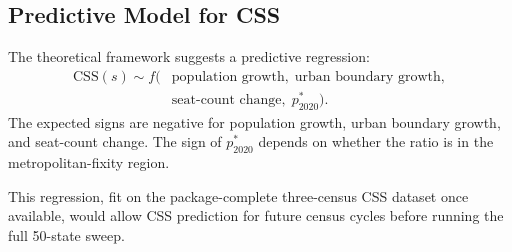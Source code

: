 \subsection{Predictive Model for CSS}

The theoretical framework suggests a predictive regression:
\begin{align*}
  \mathrm{CSS}(s) \sim f(&\text{population growth},\;
                         \text{urban boundary growth},\\
                       &\text{seat-count change},\;
                         p^*_{2020}).
\end{align*}
The expected signs are negative for population growth, urban boundary growth,
and seat-count change.  The sign of $p^*_{2020}$ depends on whether the ratio
is in the metropolitan-fixity region.

This regression, fit on the package-complete three-census CSS dataset once available,
would allow CSS prediction for future census cycles before running the full
50-state sweep.
